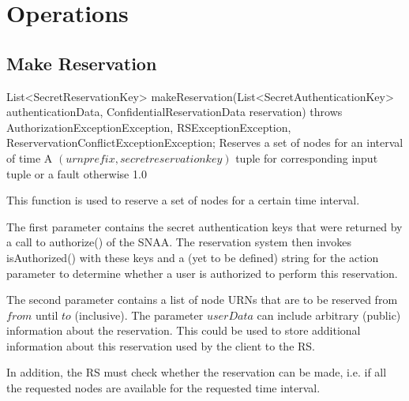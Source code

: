 \documentclass[a4paper,11pt]{article}
\begin{document}
\FloatBarrier

	\sectionfin
	\section{Operations}
	\label{sec:operations}

			\sectionfin
			\subsection{Make Reservation}
	
\begin{apidoc}
	{List<SecretReservationKey> makeReservation(List<SecretAuthenticationKey> authenticationData, ConfidentialReservationData reservation) throws AuthorizationExceptionException, RSExceptionException, ReservervationConflictExceptionException;} %
	{Reserves a set of nodes for an interval of time} %
	{
	} %
	{A $(urnprefix, secretreservationkey)$ tuple for corresponding input tuple or a fault otherwise} %
	{} %
	{1.0} %
\end{apidoc}

This function is used to reserve a set of nodes for a certain time interval. 

The first parameter contains the secret authentication keys that were returned by a call to authorize() of the SNAA. The reservation system then invokes isAuthorized() with these keys and a (yet to be defined) string for the action parameter to determine whether a user is authorized to perform this reservation. 

The second parameter contains a list of node URNs that are to be reserved from $from$ until $to$ (inclusive). The parameter $userData$ can include arbitrary (public) information about the reservation. This could be used to store additional information about this reservation used by the client to the RS.

In addition, the RS must check whether the reservation can be made, i.e. if all the requested nodes are available for the requested time interval. 
\end{document}
